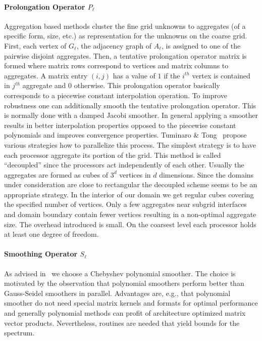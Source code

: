 \documentclass[a4paper,10pt,3p,preprint,pdftex]{elsarticle}
\begin{document}
\paragraph{Prolongation Operator $P_\ell$} Aggregation based methods
cluster the fine grid unknowns to aggregates (of a specific form, size,
etc.) as representation for the unknowns on the coarse grid.  First,
each vertex of $G_\ell$, the adjacency graph of $A_\ell$, is assigned to
one of the pairwise disjoint aggregates.  Then, a tentative prolongation
operator matrix is formed where matrix rows correspond to vertices and
matrix columns to aggregates.  A matrix entry $(i,j)$ has a value of $1$
if the $i^{th}$ vertex is contained in $j^{th}$ aggregate and $0$
otherwise.  This prolongation operator basically corresponds to a
piecewise constant interpolation operation.  To improve robustness one
can additionally smooth the tentative prolongation operator. This is
normally done with a damped Jacobi smoother.  In general applying a
smoother results in better interpolation properties opposed to the
piecewise constant polynomials and improves convergence properties.
Tuminaro \& Tong~\cite{tuto:00} propose various strategies how to
parallelize this process.  The simplest strategy is to have each
processor aggregate its portion of the grid.  This method is called
``decoupled'' since the processors act independently of each other.
Usually the aggregates are formed as cubes of $3^d$ vertices in $d$
dimensions.  Since the domains under consideration are close to
rectangular the decoupled scheme seems to be an appropriate strategy.
In the interior of our domain we get regular cubes covering the
specified number of vertices.  Only a few aggregates near subgrid
interfaces and domain boundary contain fewer vertices resulting in a
non-optimal aggregate size.  The overhead introduced is small.  On the
coarsest level each processor holds at least one degree of freedom.

\paragraph{Smoothing Operator $S_\ell$} As advised in~\cite{abht:03} we
choose a Chebyshev polynomial smoother.  The choice is motivated by the
observation that polynomial smoothers perform better than Gauss-Seidel
smoothers in parallel.  Advantages are, e.g., that polynomial smoother
do not need special matrix kernels and formats for optimal performance
and generally polynomial methods can profit of architecture optimized
matrix vector products.  Nevertheless, routines are needed that yield
bounds for the spectrum.
\end{document}
